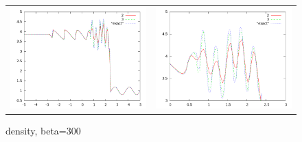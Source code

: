 \documentclass[10pt]{article}
\begin{document}
\begin{figure}
  \begin{center}
	\begin{tabular}{cc}
      \includegraphics[width=.425\textwidth]{300.png} &
	  \includegraphics[width=.425\textwidth]{300zoom.png}
	\end{tabular}
  \end{center}
  \caption{density, beta=300}
  \label{fig:pvcellcomp}
\end{figure}



\end{document}
